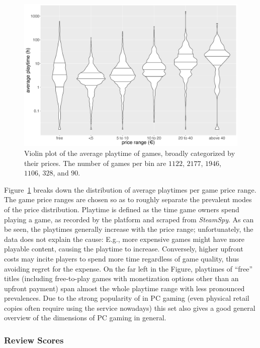 \begin{figure}[!t]
	\centering
	\includegraphics[width=1.0\columnwidth]{images/steam-cost-vs-playtime-non-sale.pdf}
	\caption{Violin plot of the average playtime of \steam games, broadly categorized by their prices. The number of games per bin are $1122$, $2177$, $1946$, $1106$, $328$, and $90$.}
\label{fig:steam-cost-vs-playtime-violin}
\end{figure}

Figure~\ref{fig:steam-cost-vs-playtime-violin} breaks down the distribution of average playtimes per game price range. The game price ranges are chosen so as to roughly separate the prevalent modes of the price distribution.
Playtime is defined as the time game owners spend playing a game, as recorded by the \steam platform and scraped from \textit{SteamSpy}. As can be seen, the playtimes generally increase with the price range; unfortunately, the data does not explain the cause: E.g., more expensive games might have more playable content, causing the playtime to increase. Conversely, higher upfront costs may incite players to spend more time regardless of game quality, thus avoiding regret for the expense. On the far left in the Figure, playtimes of ``free'' titles (including free-to-play games with monetization options other than an upfront payment) span almost the whole playtime range with less pronounced prevalences.
Due to the strong popularity of \steam in PC gaming (even physical retail copies often require using the service nowadays) this set also gives a good general overview of the dimensions of PC gaming in general.


\subsubsection{Review Scores}

